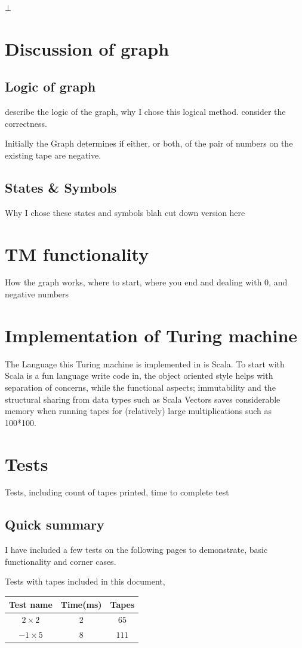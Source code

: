 \documentclass[11pt]{article}
\begin{document}
$\bot$

\section{Discussion of graph}
\subsection{Logic of graph}
describe the logic of the graph, why I chose this logical method. consider the correctness.

Initially the Graph determines if either, or both, of the pair of numbers on the existing tape are negative.

\subsection{States \& Symbols}
Why I chose these states and symbols
blah
cut down version here

\section{TM functionality}
How the graph works, where to start, where you end and dealing with 0, and negative numbers

\section{Implementation of Turing machine}

The Language this Turing machine is implemented in is Scala. To start with Scala is a fun language write code in, the object oriented style helps with separation of concerns, while the functional aspects; immutability and the structural sharing from data types such as Scala Vectors saves considerable memory when running tapes for (relatively) large multiplications such as 100*100.

\section{Tests}
Tests, including count of tapes printed, time to complete test
\subsection{Quick summary}
I have included a few tests on the following pages to demonstrate, basic functionality and corner cases.

\begin{table}[H]
\centering

Tests with tapes included in this document,  \\
\begin{tabular}{|c|c|c|}
\hline
Test name & Time(ms) & Tapes\\ \hline
$2 \times 2$ & $2$ & $65$ \\ \hline
$-1 \times 5$ & $8$ & $111$ \\ \hline
\end{tabular}
\end{table}
\end{document}
